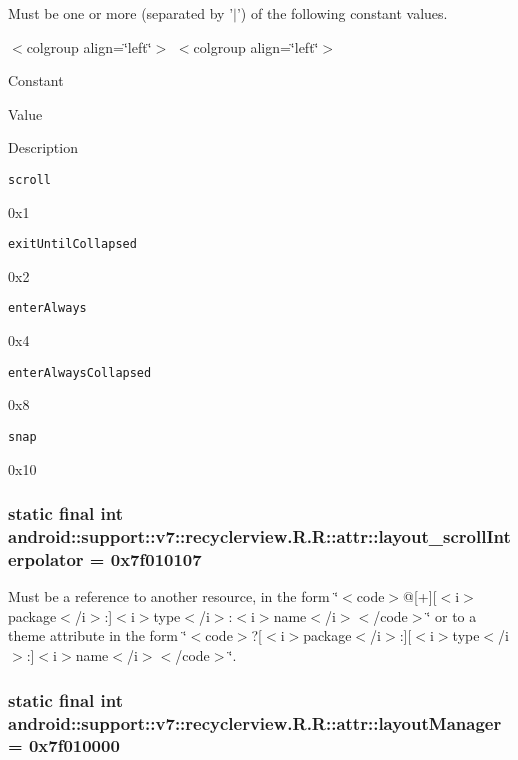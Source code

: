 Must be one or more (separated by '$|$') of the following constant values. \begin{TabularC}{0}
\hline
\end{TabularC}
$<$colgroup align=\char`\"{}left\char`\"{}$>$ $<$colgroup align=\char`\"{}left\char`\"{}$>$ 

Constant

Value

Description 

{\tt scroll}

0x1

{\tt exitUntilCollapsed}

0x2

{\tt enterAlways}

0x4

{\tt enterAlwaysCollapsed}

0x8

{\tt snap}

0x10\hypertarget{classandroid_1_1support_1_1v7_1_1recyclerview_1_1_r_1_1attr_d239ad3fff0773e5cd7f2d7d83078433}{
\subsubsection[{layout\_\-scrollInterpolator}]{\setlength{\rightskip}{0pt plus 5cm}static final int android::support::v7::recyclerview.R.R::attr::layout\_\-scrollInterpolator = 0x7f010107}}
\label{classandroid_1_1support_1_1v7_1_1recyclerview_1_1_r_1_1attr_d239ad3fff0773e5cd7f2d7d83078433}


Must be a reference to another resource, in the form \char`\"{}$<$code$>$@\mbox{[}+\mbox{]}\mbox{[}$<$i$>$package$<$/i$>$:\mbox{]}$<$i$>$type$<$/i$>$:$<$i$>$name$<$/i$>$$<$/code$>$\char`\"{} or to a theme attribute in the form \char`\"{}$<$code$>$?\mbox{[}$<$i$>$package$<$/i$>$:\mbox{]}\mbox{[}$<$i$>$type$<$/i$>$:\mbox{]}$<$i$>$name$<$/i$>$$<$/code$>$\char`\"{}. \hypertarget{classandroid_1_1support_1_1v7_1_1recyclerview_1_1_r_1_1attr_86979bbfa68a95adf098fa15628e6d8e}{
\subsubsection[{layoutManager}]{\setlength{\rightskip}{0pt plus 5cm}static final int android::support::v7::recyclerview.R.R::attr::layoutManager = 0x7f010000}}
\label{classandroid_1_1support_1_1v7_1_1recyclerview_1_1_r_1_1attr_86979bbfa68a95adf098fa15628e6d8e}


